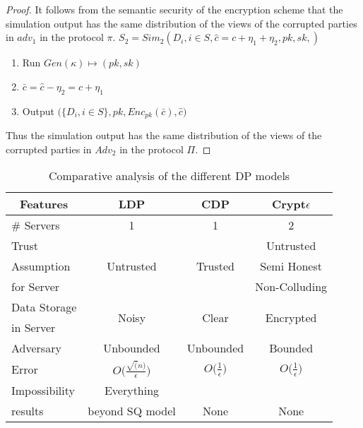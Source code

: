 \begin{proof}
It follows from the semantic security of the encryption scheme that the simulation
output has the same distribution of the views of the corrupted parties in $adv_1$ in the
protocol $\pi$.
$S_2=Sim_2(D_i, i \in S, \hat{c}=c+\eta_1+\eta_2,pk,sk,)$
\begin{enumerate}\item Run $Gen(\kappa)\mapsto (pk,sk)$ \item $\bar{c}=\hat{c}-\eta_2=c+\eta_1$
\item Output $\Big(\{D_i, i \in S\},pk,Enc_{pk}(\bar{c}),\hat{c} \Big)$
\end{enumerate}
Thus the simulation output has the same distribution of the
views of the corrupted parties in $Adv_2$ in the protocol $\Pi$. 


\end{proof}
\begin{table}[h!]
\small
\centering
\caption {Comparative analysis of the different DP models}
 \begin{tabular}{l| c c c}  \toprule
\multicolumn{1}{c}{\textbf{Features}} & \textbf{LDP}  & \textbf{CDP}  & \textbf{Crypt$\epsilon$}  \\ [0.5ex] 
 \midrule \midrule \# Servers & 1& 1 & 2\\\hline
Trust  & & & Untrusted \\  Assumption & Untrusted & Trusted & Semi Honest \\for Server &  &   &  Non-Colluding  \\ \hline
Data Storage & \multirow{2}{*}{Noisy} & \multirow{2}{*}{Clear} & \multirow{2}{*}{Encrypted} \\in Server & &  &  \\\hline
Adversary & Unbounded & Unbounded & Bounded \\\hline
 Error & $O\Big(\frac{\sqrt(n)}{\epsilon}\Big)$& $O\Big(\frac{1}{\epsilon}\Big)$ & $O\Big(\frac{1}{\epsilon}\Big)$\\\hline
 Impossibility & Everything && \\results & beyond SQ model & None & None\footnotemark\\
  [1ex] 
 \bottomrule
 \end{tabular}
\end{table}
